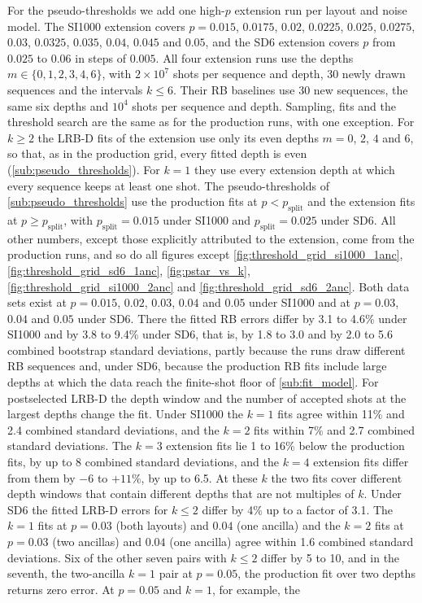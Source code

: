 For the pseudo-thresholds we add one high-$p$ extension run per layout and noise model. The SI1000 extension covers $p = 0.015$, $0.0175$, $0.02$, $0.0225$, $0.025$, $0.0275$, $0.03$, $0.0325$, $0.035$, $0.04$, $0.045$ and $0.05$, and the SD6 extension covers $p$ from $0.025$ to $0.06$ in steps of $0.005$. All four extension runs use the depths $m \in \{0, 1, 2, 3, 4, 6\}$, with $2\times10^7$ shots per sequence and depth, 30 newly drawn sequences and the intervals $k \le 6$. Their RB baselines use 30 new sequences, the same six depths and $10^4$ shots per sequence and depth. Sampling, fits and the threshold search are the same as for the production runs, with one exception. For $k \ge 2$ the LRB-D fits of the extension use only its even depths $m = 0$, $2$, $4$ and $6$, so that, as in the production grid, every fitted depth is even (\autoref{sub:pseudo_thresholds}). For $k = 1$ they use every extension depth at which every sequence keeps at least one shot. The pseudo-thresholds of \autoref{sub:pseudo_thresholds} use the production fits at $p < p_{\mathrm{split}}$ and the extension fits at $p \ge p_{\mathrm{split}}$, with $p_{\mathrm{split}} = 0.015$ under SI1000 and $p_{\mathrm{split}} = 0.025$ under SD6. All other numbers, except those explicitly attributed to the extension, come from the production runs, and so do all figures except \autoref{fig:threshold_grid_si1000_1anc}, \autoref{fig:threshold_grid_sd6_1anc}, \autoref{fig:pstar_vs_k}, \autoref{fig:threshold_grid_si1000_2anc} and \autoref{fig:threshold_grid_sd6_2anc}. Both data sets exist at $p = 0.015$, $0.02$, $0.03$, $0.04$ and $0.05$ under SI1000 and at $p = 0.03$, $0.04$ and $0.05$ under SD6. There the fitted RB errors differ by 3.1 to 4.6\% under SI1000 and by 3.8 to 9.4\% under SD6, that is, by 1.8 to 3.0 and by 2.0 to 5.6 combined bootstrap standard deviations, partly because the runs draw different RB sequences and, under SD6, because the production RB fits include large depths at which the data reach the finite-shot floor of \autoref{sub:fit_model}. For postselected LRB-D the depth window and the number of accepted shots at the largest depths change the fit. Under SI1000 the $k = 1$ fits agree within 11\% and 2.4 combined standard deviations, and the $k = 2$ fits within 7\% and 2.7 combined standard deviations. The $k = 3$ extension fits lie 1 to 16\% below the production fits, by up to 8 combined standard deviations, and the $k = 4$ extension fits differ from them by $-6$ to $+11\%$, by up to 6.5. At these $k$ the two fits cover different depth windows that contain different depths that are not multiples of $k$. Under SD6 the fitted LRB-D errors for $k \le 2$ differ by 4\% up to a factor of 3.1. The $k = 1$ fits at $p = 0.03$ (both layouts) and $0.04$ (one ancilla) and the $k = 2$ fits at $p = 0.03$ (two ancillas) and $0.04$ (one ancilla) agree within 1.6 combined standard deviations. Six of the other seven pairs with $k \le 2$ differ by 5 to 10, and in the seventh, the two-ancilla $k = 1$ pair at $p = 0.05$, the production fit over two depths returns zero error. At $p = 0.05$ and $k = 1$, for example, the 